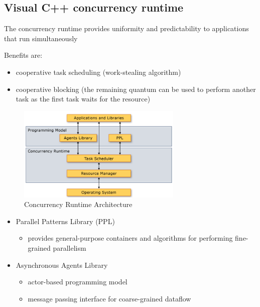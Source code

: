 \clearpage
\hypertarget{visual-c-concurrency-runtime}{%
\subsection{Visual C++ concurrency
runtime}\label{visual-c-concurrency-runtime}}

The concurrency runtime provides uniformity and predictability to
applications that run simultaneously

Benefits are:

\begin{itemize}
\tightlist
\item
  cooperative task scheduling (work-stealing algorithm)
\item
  cooperative blocking (the remaining quantum can be used to perform
  another task as the first task waits for the resource)
\end{itemize}

\begin{figure}[H]
\centering
\includegraphics[width=0.7\textwidth]{figures/parallel-architecture.png}
\caption{Concurrency Runtime Architecture}
\end{figure}

\begin{itemize}
\tightlist
\item
  Parallel Patterns Library (PPL)

  \begin{itemize}
  \tightlist
  \item
    provides general-purpose containers and algorithms for performing
    fine-grained parallelism
  \end{itemize}
\item
  Asynchronous Agents Library

  \begin{itemize}
  \tightlist
  \item
    actor-based programming model
  \item
    message passing interface for coarse-grained dataflow
  \end{itemize}
\end{itemize}

